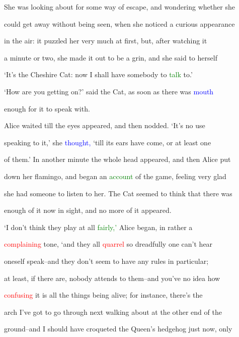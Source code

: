  She was looking about for some way of \textcolor{BurntOrange}{escape,} and wondering whether she

 could get away without being seen, when she noticed a curious appearance

 in the air: it puzzled her very much at first, but, after \textcolor{BurntOrange}{watching} it

 a minute or two, she made it out to be a \textcolor{BurntOrange}{grin,} and she said to herself

 ‘It’s the Cheshire Cat: now I shall have somebody to \textcolor{green}{talk} to.’



 ‘How are you getting on?’ said the Cat, as soon as there was \textcolor{blue}{mouth}

 enough for it to speak with.



 Alice \textcolor{BurntOrange}{waited} till the eyes appeared, and then nodded. ‘It’s no use

 speaking to it,’ she \textcolor{blue}{thought,} ‘till its ears have come, or at least one

 of them.’ In another minute the whole head appeared, and then Alice put

 down her flamingo, and began an \textcolor{green}{account} of the game, feeling very \textcolor{BurntOrange}{glad}

 she had someone to listen to her. The Cat seemed to think that there was

 enough of it now in sight, and no more of it appeared.



 ‘I don’t think they play at all \textcolor{green}{fairly,’} Alice began, in rather a

 \textcolor{red}{complaining} tone, ‘and they all \textcolor{red}{quarrel} so \textcolor{BurntOrange}{dreadfully} one can’t hear

 oneself speak--and they don’t seem to have any \textcolor{BurntOrange}{rules} in particular;

 at least, if there are, nobody attends to them--and you’ve no idea how

 \textcolor{red}{confusing} it is all the things being \textcolor{BurntOrange}{alive;} for instance, there’s the

 arch I’ve got to go through next walking about at the other end of the

 ground--and I should have croqueted the Queen’s hedgehog just now, only

